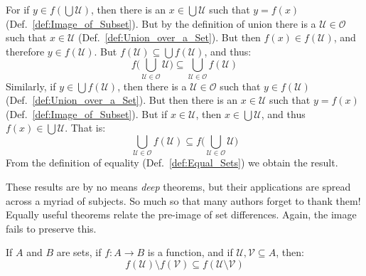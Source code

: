     \begin{bproof}
        For if $y\in{f}(\bigcup\mathcal{U})$, then there is an
        $x\in\bigcup\mathcal{U}$ such that $y=f(x)$
        (Def.~\ref{def:Image_of_Subset}). But by the definition of union
        there is a $\mathcal{U}\in\mathcal{O}$ such that $x\in\mathcal{U}$
        (Def.~\ref{def:Union_over_a_Set}). But then
        $f(x)\in{f}(\mathcal{U})$, and therefore $y\in{f}(\mathcal{U})$.
        But $f(\mathcal{U})\subseteq\bigcup{f}(\mathcal{U})$, and thus:
        \begin{equation}
            f\Big(\bigcup_{\mathcal{U}\in\mathcal{O}}\mathcal{U}\Big)
            \subseteq\bigcup_{\mathcal{U}\in\mathcal{O}}f(\mathcal{U})
        \end{equation}
        Similarly, if $y\in\bigcup{f}(\mathcal{U})$, then there is a
        $\mathcal{U}\in\mathcal{O}$ such that $y\in{f}(\mathcal{U})$
        (Def.~\ref{def:Union_over_a_Set}). But then there is an
        $x\in\mathcal{U}$ such that $y=f(x)$ (Def.~\ref{def:Image_of_Subset}).
        But if $x\in\mathcal{U}$, then $x\in\bigcup\mathcal{U}$, and thus
        $f(x)\in\bigcup\mathcal{U}$. That is:
        \begin{equation}
            \bigcup_{\mathcal{U}\in\mathcal{O}}f(\mathcal{U})\subseteq
            f\Big(\bigcup_{\mathcal{U}\in\mathcal{O}}\mathcal{U}\Big)
        \end{equation}
        From the definition of equality (Def.~\ref{def:Equal_Sets}) we obtain
        the result.
    \end{bproof}
    These results are by no means \textit{deep} theorems, but their applications
    are spread across a myriad of subjects. So much so that many authors forget
    to thank them! Equally useful theorems relate the pre-image of set
    differences. Again, the image fails to preserve this.
    \begin{theorem}
        \label{thm:Image_of_Set_Difference}%
        If $A$ and $B$ are sets, if $f:A\rightarrow B$ is a function, and if
        $\mathcal{U},\mathcal{V}\subseteq{A}$, then:
        \begin{equation*}
            f(\mathcal{U})\setminus{f}(\mathcal{V})
            \subseteq{f}(\mathcal{U}\setminus\mathcal{V})
        \end{equation*}
    \end{theorem}
